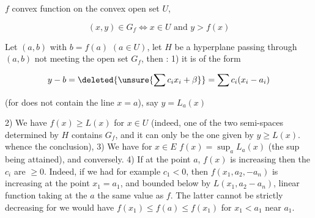 
$f$ convex function on the convex open set $U$,

\[
(x,y)\in G_f\iff x\in U\text{ and } y>f(x)
\]

Let  $(a,b)$ with $b=f(a)$ $(a\in U)$,  let $H$ be a hyperplane passing through $(a,b)$ not meeting the open set $G_f$, then : 1) it is of the form

\[
y-b=\deleted{\unsure{\sum c_i x_i+\beta}}=\sum c_i(x_i-a_i)
\]

(for does not contain the line $x=a$), say $y=L_a(x)$

2) We have $f(x)\geq L(x)$ for \uline{} $x\in U$ (indeed, one of the two   semi-spaces determined by $H$ contains $G_f$, and it can only be the one given by $y\geq L(x)$.  whence the conclusion), 3) We have for $x\in E$ $f(x)=\sup_a L_a(x)$ (the sup being attained), and conversely. 4) If at the point $a$, $f(x)$ is increasing then the $c_i$ are $\geq0$. Indeed, if we had for example $c_1<0$, then $f(x_1,a_2,-a_n)$ is increasing at the point $x_1=a_1$,
\reversemarginpar{}\normalmarginpar
and  bounded below by $L(x_1,a_2-a_n)$, linear function taking at the  $a$ the same value as $f$. The latter cannot be strictly decreasing for we would have $f(x_1)\leq f(a)\leq f(x_1)$ for $x_1<a_1$ near $a_1$.

\reversemarginpar{}\normalmarginpar
